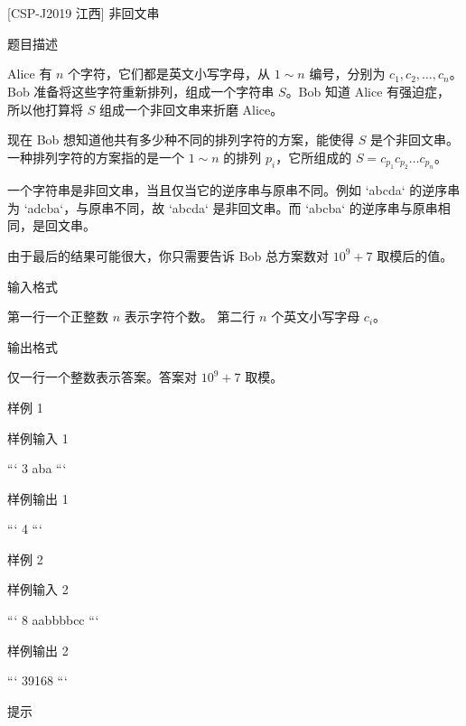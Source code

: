 \documentclass[12pt,twiside,a4paper]{ctexbook}
\numberwithin{chapter}{part}
\begin{document}
\section{}
 [CSP-J2019 江西] 非回文串

 题目描述

Alice 有 $n$ 个字符，它们都是英文小写字母，从 $1 \sim n$ 编号，分别为 $c_1,c_2, \dots , c_n$。  
Bob 准备将这些字符重新排列，组成一个字符串 $S$。Bob 知道 Alice 有强迫症，所以他打算将 $S$ 组成一个非回文串来折磨 Alice。  

现在 Bob 想知道他共有多少种不同的排列字符的方案，能使得 $S$ 是个非回文串。一种排列字符的方案指的是一个 $1 \sim n$ 的排列 $p_i$，它所组成的 $S = c_{p_1}c_{p_2} \dots c_{p_n}$。

一个字符串是非回文串，当且仅当它的逆序串与原串不同。例如 `abcda` 的逆序串为 `adcba`，与原串不同，故 `abcda` 是非回文串。而 `abcba` 的逆序串与原串相同，是回文串。

由于最后的结果可能很大，你只需要告诉 Bob 总方案数对 $10^9+7$ 取模后的值。

 输入格式

第一行一个正整数 $n$ 表示字符个数。   
第二行 $n$ 个英文小写字母 $c_i$。

 输出格式

仅一行一个整数表示答案。答案对 $10^9+7$ 取模。

 样例 1

 样例输入 1

```
3
aba
```

 样例输出 1

```
4
```

 样例 2

 样例输入 2

```
8
aabbbbcc
```

 样例输出 2

```
39168
```

 提示
\end{document}
